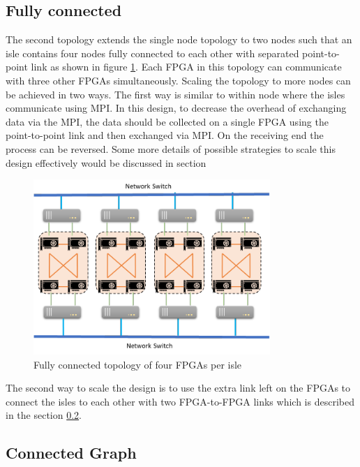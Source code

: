 \subsection{Fully connected}
\label{sec:fully_connect}

The second topology extends the single node topology to two nodes such that
an isle contains four nodes fully connected to each other with separated 
point-to-point link as shown in figure \ref{fig:fully_connect}.
Each FPGA in this topology can communicate with three
other FPGAs simultaneously. Scaling the topology to more nodes can be achieved
in two ways. The first way is similar to within node where the isles communicate
using MPI. In this design, to decrease the overhead of exchanging data via the
MPI, the data should be collected on a single FPGA using the point-to-point
link and then exchanged via MPI. On the receiving end the process can be
reversed. Some more details of possible strategies to scale this design
effectively would be discussed in section  

\begin{figure}[h]%
    \centering
    \includegraphics[width=0.8\textwidth]{images/full_connect}
    \caption{Fully connected topology of four FPGAs per isle}
    \label{fig:fully_connect}
\end{figure}

The second way to scale the design is to use the extra link left on the 
FPGAs to connect the isles to each other with two FPGA-to-FPGA links which is described in the section \ref{sec:connected_graph}.

\subsection{Connected Graph}
\label{sec:connected_graph}

